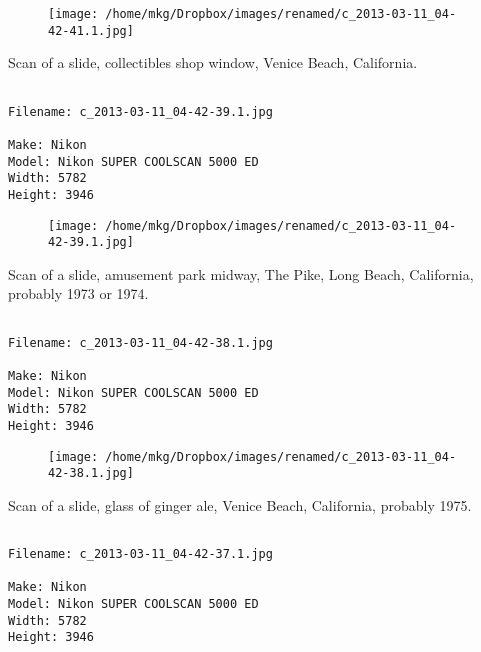 \begin{figure}
\texttt{[image: /home/mkg/Dropbox/images/renamed/c\_2013-03-11\_04-42-41.1.jpg]}
\end{figure}
    
\clearpage
\onecolumn
\noindent Scan of a slide, collectibles shop window, Venice Beach, California.
\noindent
\begin{lstlisting}

Filename: c_2013-03-11_04-42-39.1.jpg

Make: Nikon
Model: Nikon SUPER COOLSCAN 5000 ED
Width: 5782
Height: 3946
\end{lstlisting}
\clearpage

\begin{figure}
\texttt{[image: /home/mkg/Dropbox/images/renamed/c\_2013-03-11\_04-42-39.1.jpg]}
\end{figure}
    
\clearpage
\onecolumn
\noindent Scan of a slide, amusement park midway, The Pike, Long Beach, California, probably 1973 or 1974.
\noindent
\begin{lstlisting}

Filename: c_2013-03-11_04-42-38.1.jpg

Make: Nikon
Model: Nikon SUPER COOLSCAN 5000 ED
Width: 5782
Height: 3946
\end{lstlisting}
\clearpage

\begin{figure}
\texttt{[image: /home/mkg/Dropbox/images/renamed/c\_2013-03-11\_04-42-38.1.jpg]}
\end{figure}
    
\clearpage
\onecolumn
\noindent Scan of a slide, glass of ginger ale, Venice Beach, California, probably 1975.
\noindent
\begin{lstlisting}

Filename: c_2013-03-11_04-42-37.1.jpg

Make: Nikon
Model: Nikon SUPER COOLSCAN 5000 ED
Width: 5782
Height: 3946
\end{lstlisting}
\clearpage

